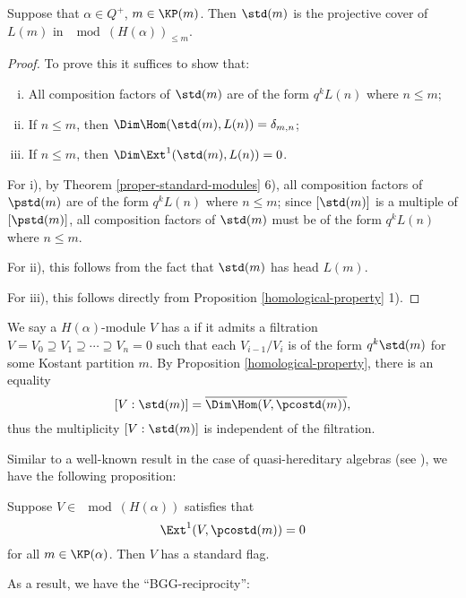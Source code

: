 \begin{corollary}
    Suppose that $\alpha\in Q^+$, $m\in\KP(m)$. Then
    $\std(m)$ is the projective cover of $L(m)$ in $\mod(H(\alpha))_{\le m}$.
\end{corollary}

\begin{proof}
    To prove this it suffices to show that:
    \begin{enumerate}[i)]
        \item All composition factors of $\std(m)$ are 
        of the form $q^k L(n)$ where $n\le m$;
        \item If $n\le m$, then $\Dim\Hom(\std(m),L(n)) = \delta_{m,n}$;
        \item If $n\le m$, then $\Dim\Ext^1(\std(m),L(n)) = 0$.
    \end{enumerate}

    For i), by Theorem \ref{proper-standard-modules} 6),
    all composition factors of $\pstd(m)$ are 
    of the form $q^k L(n)$ where $n\le m$; since $[\std(m)]$
    is a multiple of $[\pstd(m)]$, 
    all composition factors of $\std(m)$ must be 
    of the form $q^k L(n)$ where $n\le m$.

    For ii), this follows from the fact that $\std(m)$ has
    head $L(m)$.

    For iii), this follows directly from Proposition
    \ref{homological-property} 1).
\end{proof}

We say a $H(\alpha)$-module $V$ has a 
if it admits a filtration $V = V_0\supseteq V_1\supseteq\cdots
\supseteq V_n = 0$ such that each $V_{i-1}/V_i$ is of the form
$q^k\std(m)$ for some Kostant partition $m$. By Proposition \ref{homological-property},
there is an equality 
\[
    [V:\std(m)] = \overline{\Dim\Hom(V,\pcostd(m))},
\]
thus the multiplicity $[V:\std(m)]$ is independent of the 
filtration.

Similar to a well-known result in the case of quasi-hereditary algebras (see
\cite[Proposition A2.2]{Do}), we have the following proposition:

\begin{proposition}\cite[Theorem 3.13]{BKM}
    Suppose $V\in\mod(H(\alpha))$ satisfies that $$\Ext^1(V,\pcostd(m)) = 0$$
    for all $m\in\KP(\alpha)$. Then $V$ has a standard flag.
\end{proposition}

As a result, we have the ``BGG-reciprocity'':

